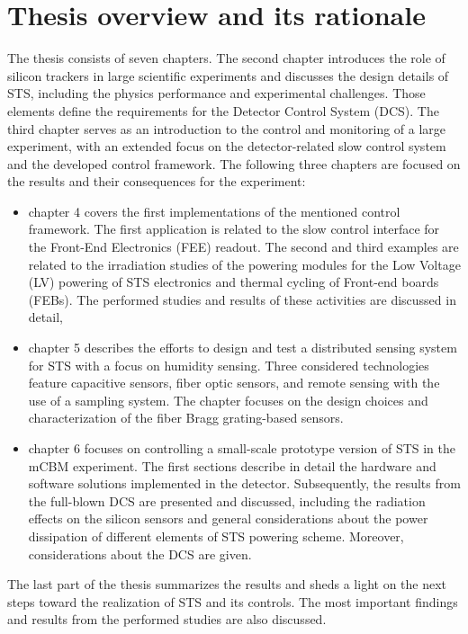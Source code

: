 \section{Thesis overview and its rationale}
The thesis consists of seven chapters. The second chapter introduces the role of silicon trackers in large scientific experiments and discusses the design details of \gls{STS}, including the physics performance and experimental challenges. Those elements define the requirements for the Detector Control System (\gls{DCS}). The third chapter serves as an introduction to the control and monitoring of a large experiment, with an extended focus on the detector-related slow control system and the developed control framework. The following three chapters are focused on the results and their consequences for the experiment:
\begin{itemize}
    \item chapter 4 covers the first implementations of the mentioned control framework. The first application is related to the slow control interface for the Front-End Electronics (\gls{FEE}) readout. The second and third examples are related to the irradiation studies of the powering modules for the Low Voltage (\gls{LV}) powering of \gls{STS} electronics and thermal cycling of Front-end boards (\glspl{FEB}). The performed studies and results of these activities are discussed in detail,
    \item chapter 5 describes the efforts to design and test a distributed sensing system for \gls{STS} with a focus on humidity sensing. Three considered technologies feature capacitive sensors, fiber optic sensors, and remote sensing with the use of a sampling system. The chapter focuses on the design choices and characterization of the fiber Bragg grating-based sensors. 
    \item chapter 6 focuses on controlling a small-scale prototype version of \gls{STS} in the \gls{mCBM} experiment. The first sections describe in detail the hardware and software solutions implemented in the detector. Subsequently, the results from the full-blown \gls{DCS} are presented and discussed, including the radiation effects on the silicon sensors and general considerations about the power dissipation of different elements of \gls{STS} powering scheme. Moreover, considerations about the \gls{DCS} are given. 
\end{itemize}
The last part of the thesis summarizes the results and sheds a light on the next steps toward the realization of \gls{STS} and its controls. The most important findings and results from the performed studies are also discussed.